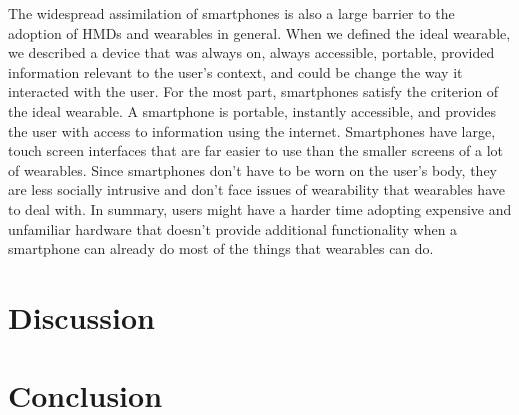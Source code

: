 \documentclass[11pt]{article}
\newcommand{\myreferences}{references}
\begin{document}
The widespread assimilation of smartphones is also a large barrier to the adoption of HMDs and wearables in general. When we defined the ideal wearable, we described a device that was always on, always accessible, portable, provided information relevant to the user's context, and could be change the way it interacted with the user. For the most part, smartphones satisfy the criterion of the ideal wearable\cite{fromCyborgsToGG}. A smartphone is portable, instantly accessible, and provides the user with access to information using the internet. Smartphones have large, touch screen interfaces that are far easier to use than the smaller screens of a lot of wearables. Since smartphones don't have to be worn on the user's body, they are less socially intrusive and don't face issues of wearability that wearables have to deal with. In summary, users might have a harder time adopting expensive and unfamiliar hardware that doesn't provide additional functionality when a smartphone can already do most of the things that wearables can do.  

\section{Discussion}
\section{Conclusion}


\end{document}
